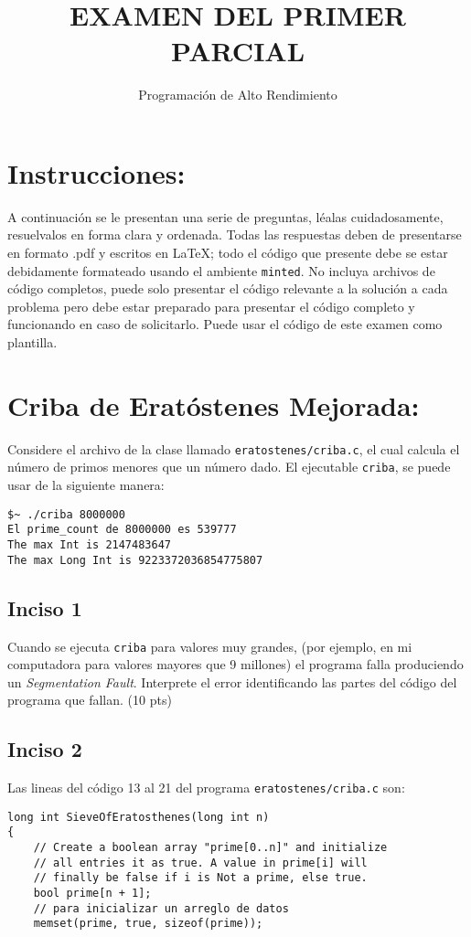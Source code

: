 \documentclass{article}
\title{EXAMEN DEL PRIMER PARCIAL}
\author{ Programación de Alto Rendimiento }
\begin{document}
\maketitle

\section*{Instrucciones:} A continuación se le presentan una serie de preguntas, léalas cuidadosamente, resuelvalos en forma clara y ordenada. Todas las respuestas deben de presentarse en formato .pdf y escritos en LaTeX; todo el código que presente debe se estar debidamente formateado usando el ambiente \texttt{minted}. No incluya archivos de código completos, puede solo presentar el código relevante a la solución a cada problema pero debe estar preparado para presentar el código completo y funcionando en caso de solicitarlo. Puede usar el código de este examen como plantilla.


\section{Criba de Eratóstenes Mejorada:}
Considere el archivo de la clase llamado \texttt{eratostenes/criba.c}, el cual calcula el número de primos menores que un número dado. El ejecutable \texttt{criba}, se puede usar de la siguiente manera:

\begin{verbatim}
$~ ./criba 8000000
El prime_count de 8000000 es 539777 
The max Int is 2147483647 
The max Long Int is 9223372036854775807 

\end{verbatim}

\subsection{Inciso 1}
Cuando se ejecuta \texttt{criba} para valores muy grandes, (por ejemplo, en mi computadora para valores mayores que 9 millones) el programa falla produciendo un \textit{Segmentation Fault}. Interprete el error identificando las partes del código del programa que fallan. (10 pts)

\subsection{Inciso 2}
Las lineas del  código 13 al 21 del programa \texttt{eratostenes/criba.c} son:

\begin{verbatim}
long int SieveOfEratosthenes(long int n)
{
    // Create a boolean array "prime[0..n]" and initialize
    // all entries it as true. A value in prime[i] will
    // finally be false if i is Not a prime, else true.
    bool prime[n + 1];
    // para inicializar un arreglo de datos
    memset(prime, true, sizeof(prime));
\end{verbatim}
\end{document}

